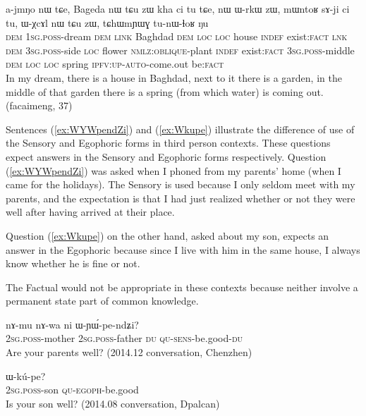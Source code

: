 \documentclass[oldfontcommands,oneside,a4paper,11pt]{article}
\newcommand{\ipa}[1]{{\phon \mbox{#1}}} %
\newcommand{\refb}[1]{(\ref{#1})}
\begin{document}
\begin{exe}
\ex  \label{ex:ajmNo}
\gll \ipa{nɯ}	\ipa{a-jmŋo}	\ipa{nɯ}	\ipa{tɕe,}	Bageda	\ipa{nɯ} \ipa{tɕu}	\ipa{zɯ}	\ipa{kha}	\ipa{ci}	\ipa{tu}	\ipa{tɕe,} \ipa{nɯ}	\ipa{ɯ-rkɯ}	\ipa{zɯ,}	\ipa{mɯntoʁ}	\ipa{sɤ-ji}	\ipa{ci}	\ipa{tu,}	\ipa{ɯ-χcɤl}	\ipa{nɯ} \ipa{tɕu}	\ipa{zɯ,}	\ipa{tɕhɯmɲɯɣ}	\ipa{tu-nɯ-ɬoʁ}	\ipa{ŋu} \\
\textsc{dem} \textsc{1sg.poss}-dream \textsc{dem} \textsc{link} Baghdad \textsc{dem} \textsc{loc} \textsc{loc} house \textsc{indef} exist:\textsc{fact} \textsc{lnk} \textsc{dem} \textsc{3sg.poss}-side \textsc{loc} flower \textsc{nmlz:oblique}-plant \textsc{indef} exist:\textsc{fact} \textsc{3sg.poss}-middle 
\textsc{dem} \textsc{loc} \textsc{loc} spring \textsc{ipfv:up-auto}-come.out be:\textsc{fact} \\
\glt In my dream, there is a house in Baghdad, next to it there is a garden, in the middle of that garden there is a spring (from which water) is coming out. (facaimeng, 37)
\end{exe}

Sentences \refb{ex:WYWpendZi} and \refb{ex:Wkupe} illustrate the difference of use of the Sensory and Egophoric forms in third person contexts. These questions expect answers in the Sensory and Egophoric forms respectively. Question \refb{ex:WYWpendZi} was asked when I phoned from my parents' home (when I came for the holidays). The Sensory is used because I only seldom meet with my parents, and the expectation is that I had just realized whether or not they were well after having arrived at their place. 

Question \refb{ex:Wkupe} on the other hand, asked about my son, expects an answer in the Egophoric because since I live with him in the same house, I always know whether he is fine or not.

The Factual would not be appropriate in these contexts because neither involve a permanent state part of common knowledge.

\begin{exe}
\ex \label{ex:WYWpendZi}
\gll 
\ipa{nɤ-mu}  	\ipa{nɤ-wa}  	\ipa{ni}  	\ipa{ɯ-ɲɯ́-pe-ndʑi?}  \\
\textsc{2sg.poss}-mother \textsc{2sg.poss}-father \textsc{du} \textsc{qu-sens}-be.good-\textsc{du} \\
\glt Are your parents well? (2014.12 conversation, Chenzhen)
\end{exe}


\begin{exe}
\ex \label{ex:Wkupe}
\gll \ipa{nɤ-tɕɯ} \ipa{ɯ-kú-pe?}\\
\textsc{2sg.poss}-son \textsc{qu-egoph}-be.good\\
\glt Is your son well? (2014.08 conversation, Dpalcan)
\end{exe}
\end{document}
